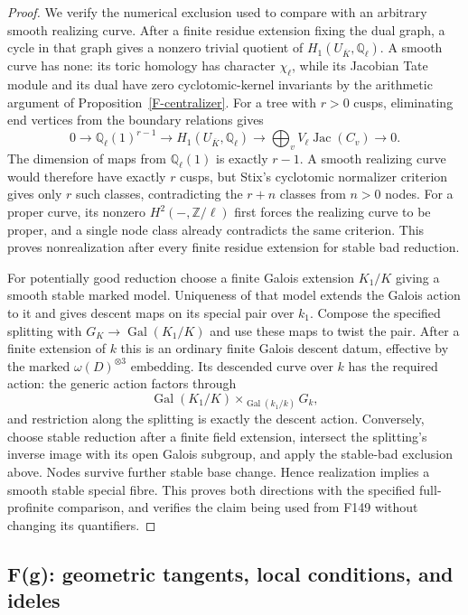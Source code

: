 \documentclass[11pt,oneside]{article}
\begin{document}
\begin{proof}
We verify the numerical exclusion used to compare with an
arbitrary smooth realizing curve. After a finite residue extension
fixing the dual graph, a cycle in that graph gives a nonzero
trivial quotient of $H_1(U_{\overline K},\mathbb Q_\ell)$.
A smooth curve has none: its toric homology has character
$\chi_\ell$, while its Jacobian Tate module and its dual have
zero cyclotomic-kernel invariants by the arithmetic argument of
Proposition~\ref{F-centralizer}. For a tree with $r>0$ cusps,
eliminating end vertices from the boundary relations gives
\[
 0\to\mathbb Q_\ell(1)^{r-1}\to H_1(U_{\overline K},\mathbb Q_\ell)
 \to\bigoplus_v V_\ell\operatorname{Jac}(C_v)\to0.
\]
The dimension of maps from $\mathbb Q_\ell(1)$ is exactly $r-1$.
A smooth realizing curve would therefore have exactly $r$ cusps,
but Stix's cyclotomic normalizer criterion gives only $r$ such
classes, contradicting the $r+n$ classes from $n>0$ nodes. For
a proper curve, its nonzero $H^2(-,\mathbb Z/\ell)$ first forces
the realizing curve to be proper, and a single node class already
contradicts the same criterion. This proves nonrealization after
every finite residue extension for stable bad reduction.

For potentially good reduction choose a finite Galois extension
$K_1/K$ giving a smooth stable marked model. Uniqueness of that
model extends the Galois action to it and gives descent maps on
its special pair over $k_1$. Compose the specified splitting with
$G_K\to\operatorname{Gal}(K_1/K)$ and use these maps to twist
the pair. After a finite extension of $k$ this is an ordinary
finite Galois descent datum, effective by the marked
$\omega(D)^{\otimes3}$ embedding. Its descended curve over $k$
has the required action: the generic action factors through
\[
 \operatorname{Gal}(K_1/K)
       \times_{\operatorname{Gal}(k_1/k)}G_k,
\]
and restriction along the splitting is exactly the descent action.
Conversely, choose stable reduction after a finite field
extension, intersect the splitting's inverse image with its open
Galois subgroup, and apply the stable-bad exclusion above. Nodes
survive further stable base change. Hence realization implies a
smooth stable special fibre. This proves both directions with the
specified full-profinite comparison, and verifies the claim being
used from F149 without changing its quantifiers.
\end{proof}

\subsection{F(g): geometric tangents, local conditions, and ideles}
\end{document}
